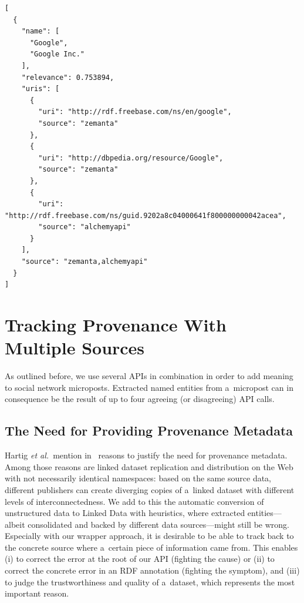 \newpage

\begin{lstlisting}[caption={
   [Consolidated output of two named-entity recognition APIs]
   {Consolidated output of two named-entity recognition APIs,
    namely Zemanta and AlchemyAPI.}
  },
  label={code:googlecombined}]
[
  {
    "name": [
      "Google",
      "Google Inc."
    ],
    "relevance": 0.753894,
    "uris": [
      {
        "uri": "http://rdf.freebase.com/ns/en/google",
        "source": "zemanta"
      },
      {
        "uri": "http://dbpedia.org/resource/Google",
        "source": "zemanta"
      },
      {
        "uri": "http://rdf.freebase.com/ns/guid.9202a8c04000641f800000000042acea",
        "source": "alchemyapi"
      }
    ],
    "source": "zemanta,alchemyapi"
  }
]
\end{lstlisting}

\section{Tracking Provenance With Multiple Sources}                    \label{sec:tracking}

As outlined before, we use several APIs in combination
in order to add meaning to social network microposts.
Extracted named entities from a~micropost can in consequence
be the result of up to four agreeing (or disagreeing) API calls.

\subsection{The Need for Providing Provenance Metadata}

Hartig \emph{et al.}\ mention in~\cite{hartig2010provenance}
reasons to justify the need for provenance metadata.
Among those reasons are linked dataset replication and distribution
on the Web with not necessarily identical namespaces:
based on the same source data, different publishers can
create diverging copies of a~linked dataset
with different levels of interconnectedness.
We add to this the automatic conversion of unstructured data
to Linked Data with heuristics,
where extracted entities---albeit consolidated
and backed by different data sources---might still be wrong.
Especially with our wrapper approach,
it is desirable to be able to track back to the concrete source
where a~certain piece of information came from.
This enables
(i) to correct the error at the root of our API
(fighting the cause) or
(ii) to correct the concrete error in an RDF annotation
(fighting the symptom), and
(iii) to judge the trustworthiness and quality of a~dataset,
which represents the most important reason.

